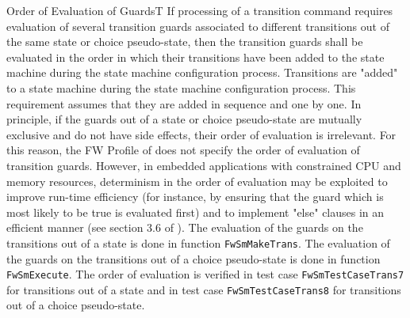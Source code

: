 \documentclass[a4paper,10pt]{article}
\newenvironment{fw_req_note}[7]
{\addtocounter{subsubsection}{1}
	\hspace{0.2cm}\textbf{FW-\arabic{section}.\arabic{subsection}.\arabic{subsubsection}/#2
	\hspace{0.8cm} #1}
	\vspace{-10pt}
\begin{longtable}{p{2.7cm}P{8.5cm}}
\hline
\textsc{Requirement} & #3 \\
\textsc{Note} & #4 \\
\textsc{Justification} & #5 \\
\textsc{Implementation} & #6  \\ 
\textsc{Verification} & #7  \\
\hline
}
{\end{longtable}}
\begin{document}
\begin{fw_req_note}{Order of Evaluation of Guards}{T}
{If processing of a transition command requires evaluation of several transition guards associated to different transitions out of the same state or choice pseudo-state, then the transition guards shall be evaluated in the order in which their transitions have been added to the state machine during the state machine configuration process.}
{Transitions are "added" to a state machine during the state machine configuration process.
This requirement assumes that they are added in sequence and one by one.}
{In principle, if the guards out of a state or choice pseudo-state are mutually exclusive and do not have side effects, their order of evaluation is irrelevant. 
For this reason, the FW Profile of \cite{ref:fwprofile} does not specify the order of evaluation of transition guards.
However, in embedded applications with constrained CPU and memory resources, determinism in the order of evaluation may be exploited to improve run-time efficiency (for instance, by ensuring that the guard which is most likely to be true is evaluated first) and to implement "else" clauses in an efficient manner (see section 3.6 of \cite{ref:um}).}
{The evaluation of the guards on the transitions out of a state is done in function \texttt{FwSmMakeTrans}.
The evaluation of the guards on the transitions out of a choice pseudo-state is done in function \texttt{FwSmExecute}.} 
{The order of evaluation is verified in test case \texttt{FwSmTestCaseTrans7} for transitions out of a state and in test case \texttt{FwSmTestCaseTrans8} for transitions out of a choice pseudo-state.}
\end{fw_req_note}
\end{document}
